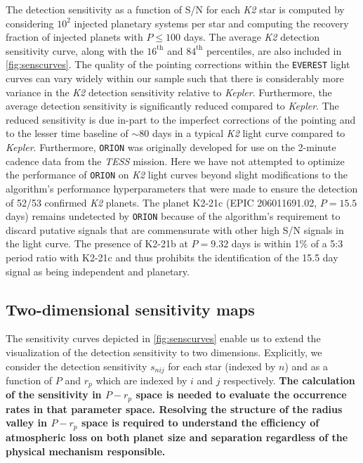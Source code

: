 \documentclass[twocolumn]{emulateapj}
\newcommand{\kepler}[1]{\emph{Kepler}#1}
\newcommand{\ktwo}[1]{\emph{K2}#1}
\newcommand{\tess}[1]{\emph{TESS}#1}
\begin{document}
The detection sensitivity as a function of S/N for each \ktwo{} star is computed by considering
$10^2$ injected planetary systems per star and computing the recovery fraction of injected planets with
$P \leq 100$ days. The average \ktwo{} detection sensitivity curve, along with the
$16^{\text{th}}$ and $84^{\text{th}}$ percentiles, are also included in \autoref{fig:senscurves}. The quality
of the pointing corrections within the \texttt{EVEREST} light curves can vary widely within our sample such
that there is considerably more variance in the \ktwo{} detection sensitivity relative to \kepler{.} Furthermore,
the average detection sensitivity is significantly reduced compared to \kepler{.} %
The reduced sensitivity is due in-part to the imperfect corrections of the pointing and
to the lesser time baseline of $\sim 80$ days in a typical \ktwo{} light curve compared to \kepler{.} 
Furthermore, \texttt{ORION} was originally developed for use on the 2-minute cadence data
from the \tess{} mission. Here
we have not attempted to optimize the performance of \texttt{ORION} on \ktwo{} light curves 
beyond slight modifications to the algorithm's performance hyperparameters that were made to ensure the
detection of 52/53 confirmed \ktwo{} planets. The planet K2-21c (EPIC 206011691.02, $P=15.5$ days)
remains undetected by \texttt{ORION} because of the algorithm's requirement to discard putative signals
that are commensurate with other high S/N signals in the light curve. The presence of K2-21b at $P=9.32$ days
is within 1\% of a 5:3 period ratio with K2-21c and thus prohibits the identification of the 15.5 day signal
as being independent and planetary.


\subsection{Two-dimensional sensitivity maps}
The sensitivity curves depicted in \autoref{fig:senscurves} enable us to extend the visualization of the
detection sensitivity to two dimensions. Explicitly, we consider the detection sensitivity
$s_{nij}$ for each star (indexed by $n$) and as a function of $P$ and $r_p$ which are indexed by $i$ and
$j$ respectively. \textbf{The calculation of the sensitivity in $P-r_p$ space is needed to evaluate the
  occurrence rates in that parameter space. Resolving the structure of the radius valley
  in $P-r_p$ space is required to understand the efficiency of atmospheric loss on
  both planet size and separation regardless of the physical mechanism responsible.}
\end{document}
